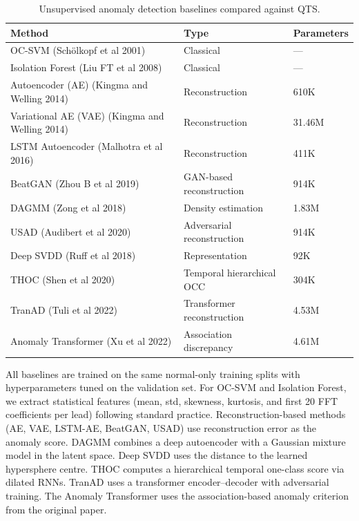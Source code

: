 \documentclass{iopjournal}
\begin{document}
\begin{table}[h]
\centering
\caption{Unsupervised anomaly detection baselines compared against QTS. }
\label{tab:baselines}
\begin{tabular}{llB}
\hline
Method & Type & Parameters \\
\hline
OC-SVM (Sch\"olkopf et al 2001) & Classical & --- \\
Isolation Forest (Liu FT et al 2008) & Classical & --- \\
Autoencoder (AE) (Kingma and Welling 2014) & Reconstruction & 610K \\
Variational AE (VAE) (Kingma and Welling 2014) & Reconstruction & 31.46M \\
LSTM Autoencoder (Malhotra et al 2016) & Reconstruction & 411K \\
BeatGAN (Zhou B et al 2019) & GAN-based reconstruction & 914K \\
DAGMM (Zong et al 2018) & Density estimation & 1.83M \\
USAD (Audibert et al 2020) & Adversarial reconstruction & 914K \\
Deep SVDD (Ruff et al 2018) & Representation & 92K \\
THOC (Shen et al 2020) & Temporal hierarchical OCC & 304K \\
TranAD (Tuli et al 2022) & Transformer reconstruction & 4.53M \\
Anomaly Transformer (Xu et al 2022) & Association discrepancy & 4.61M \\
\hline
\end{tabular}
\end{table}

All baselines are trained on the same normal-only training splits with hyperparameters tuned on the validation set. For OC-SVM and Isolation Forest, we extract statistical features (mean, std, skewness, kurtosis, and first 20 FFT coefficients per lead) following standard practice. Reconstruction-based methods (AE, VAE, LSTM-AE, BeatGAN, USAD) use reconstruction error as the anomaly score. DAGMM combines a deep autoencoder with a Gaussian mixture model in the latent space. Deep SVDD uses the distance to the learned hypersphere centre. THOC computes a hierarchical temporal one-class score via dilated RNNs. TranAD uses a transformer encoder--decoder with adversarial training. The Anomaly Transformer uses the association-based anomaly criterion from the original paper. 
\end{document}
